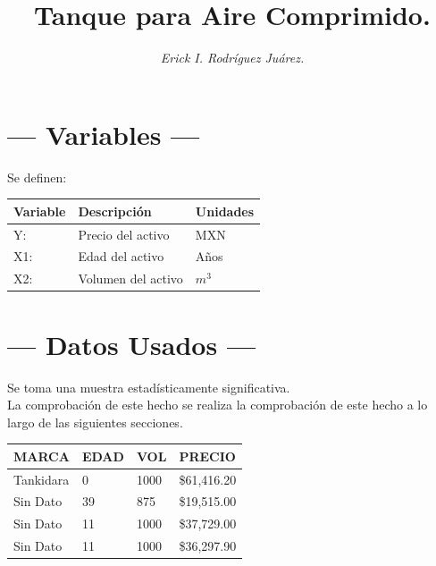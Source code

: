 \documentclass{article}
\title{\sc Tanque para Aire Comprimido.}
\author{\it Erick I. Rodríguez Juárez.}
\begin{document}
\maketitle

\section{\centering --- Variables ---} %
Se definen:
\begin{center}
  \begin{tabular}{|l|l|l|}
    \hline 
    Variable & Descripción   & Unidades\\ \hline 
    Y:  & Precio del activo  & MXN \\ \hline 
    X1: & Edad del activo    & Años \\ \hline 
		X2: & Volumen del activo & \(m ^ 3\) \\ \hline 
  \end{tabular}
\end{center} 

\section{\centering --- Datos Usados ---} %
Se toma una muestra estadísticamente significativa. \\ 
La comprobación de este hecho se realiza la comprobación de este hecho a lo largo de las siguientes secciones.
\begin{center}
	\begin{tabular}{*{4}{|p{2cm}}|}
		\hline 
		MARCA     & EDAD &  VOL   & PRECIO \\ \hline 
		Tankidara & 0    &  1000  & \$61,416.20 \\ \hline 
		Sin Dato  & 39   &  875   & \$19,515.00 \\ \hline 
		Sin Dato  & 11   &  1000  & \$37,729.00 \\ \hline 
		Sin Dato  & 11   &  1000  & \$36,297.90 \\ \hline
	\end{tabular}
\end{center}
\end{document}
